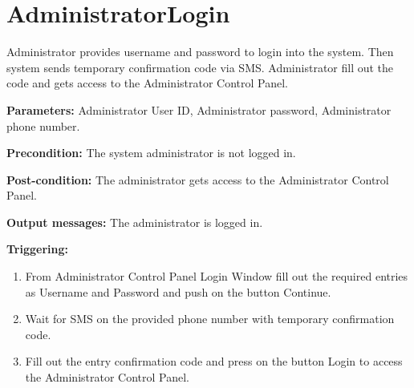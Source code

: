 \section{AdministratorLogin}
\label{operation:AdministratorLogin}
Administrator provides username and password to login into the system. 
Then system sends temporary confirmation code via SMS. 
Administrator fill out the code and gets access to the Administrator Control Panel.

\begin{description}

\item \textbf{Parameters:} Administrator User ID, Administrator password,
Administrator phone number.
\item \textbf{Precondition:} The system administrator is not logged in.
\item \textbf{Post-condition:} The administrator gets access to the
Administrator Control Panel.
\item \textbf{Output messages:} The administrator is logged in.

\item \textbf{Triggering:}
\begin{enumerate}
\item From Administrator Control Panel Login Window fill out the required entries as Username and Password and push on the button Continue.
\item Wait for SMS on the provided phone number with temporary confirmation code.
\item Fill out the entry confirmation code and press on the button Login to
access the Administrator Control Panel.
\end{enumerate}
 
\end{description}



